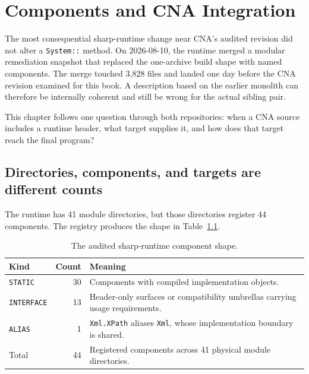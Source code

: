 \chapter{Components and CNA Integration}
\label{ch:sharp-components-consumption}

The most consequential sharp-runtime change near CNA's audited revision did not alter a
\texttt{System::} method. On 2026-08-10, the runtime merged a modular remediation snapshot
that replaced the one-archive build shape with named components. The merge touched 3{,}828
files and landed one day before the CNA revision examined for this book. A description based
on the earlier monolith can therefore be internally coherent and still be wrong for the
actual sibling pair.

This chapter follows one question through both repositories: when a CNA source includes a
runtime header, what target supplies it, and how does that target reach the final program?



\section{Directories, components, and targets are different counts}

The runtime has 41 module directories, but those directories register 44 components. The
registry produces the shape in Table~\ref{tab:sharp-component-shape}.

\begin{table}[htbp]
  \centering
  \caption{The audited sharp-runtime component shape.}
  \label{tab:sharp-component-shape}
  \begin{tabular}{@{}lrp{}@{}}
    \toprule
    Kind & Count & Meaning \\
    \midrule
    \texttt{STATIC} & 30 & Components with compiled implementation objects. \\
    \texttt{INTERFACE} & 13 & Header-only surfaces or compatibility umbrellas carrying usage requirements. \\
    \texttt{ALIAS} & 1 & \texttt{Xml.XPath} aliases \texttt{Xml}, whose implementation boundary is shared. \\
    \midrule
    Total & 44 & Registered components across 41 physical module directories. \\
    \bottomrule
  \end{tabular}
\end{table}

